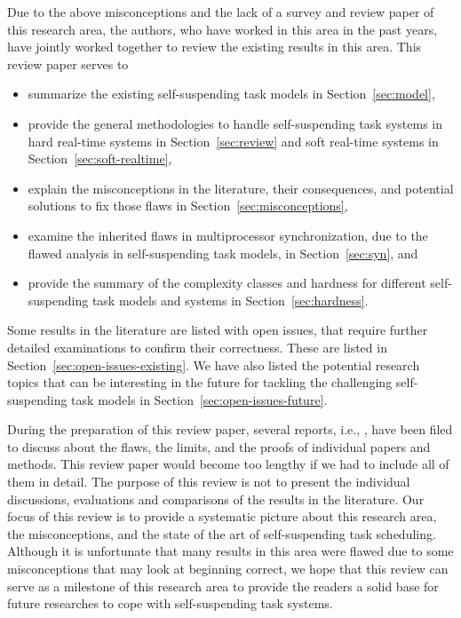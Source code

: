 \noindent Due to the above misconceptions and the lack of a survey and review paper of this research area, the authors, who have worked in this area in the past years, have jointly worked together to review the existing results in this area. This review paper serves to
\begin{itemize}
\item summarize the existing self-suspending task models in Section~\ref{sec:model}, 
\item provide the general methodologies to handle self-suspending task systems in hard real-time systems in Section~\ref{sec:review} and soft real-time systems in Section~\ref{sec:soft-realtime}, 
\item explain the misconceptions in the literature, their consequences, and potential solutions to fix those flaws in Section~\ref{sec:misconceptions}, 
\item examine the inherited flaws in multiprocessor synchronization, due to the flawed analysis in self-suspending task models, in Section~\ref{sec:syn}, and
\item provide the summary of the complexity classes and hardness for different self-suspending task models and systems in Section~\ref{sec:hardness}.
\end{itemize}
Some results in the literature are listed with open issues, that require further detailed examinations to confirm their correctness. These are listed in Section~\ref{sec:open-issues-existing}. We have also listed the potential research topics that can be interesting in the future for tackling the challenging self-suspending task models in Section~\ref{sec:open-issues-future}.

During the preparation of this review paper, several reports, i.e., \cite{ChenHuangNelissen,ChenBrandenburg,erratu-cong-anderson,BletsasReport2015}, have been filed to discuss about the flaws, the limits, and the proofs of individual papers and methods. This review paper would become too lengthy if we had to include all of them in detail.  The purpose of this review is not to present the individual discussions, evaluations and comparisons of the results in the literature. Our focus of this review is to provide a systematic picture about this research area, the misconceptions, and the state of the art of self-suspending task scheduling. Although it is unfortunate that many results in this area were flawed due to some misconceptions that may look at beginning correct, we hope that this review can serve as a milestone of this research area to provide the readers a solid base for future researches to cope with self-suspending task systems.





    
  